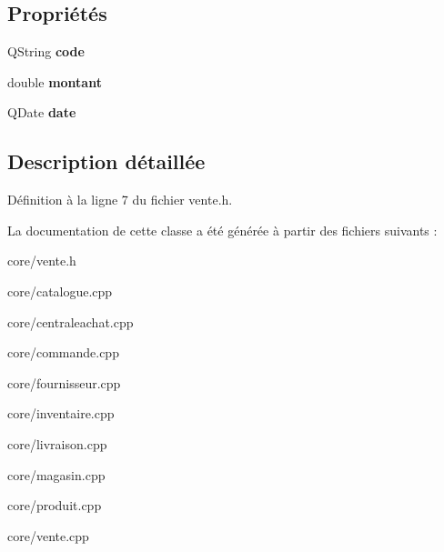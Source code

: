 \subsection*{Propriétés}
\begin{DoxyCompactItemize}
\item 
\hypertarget{class_vente_a6896578d31d7e92927ce3130b4433299}{
QString {\bfseries code}}
\label{d8/dd9/class_vente_a6896578d31d7e92927ce3130b4433299}

\item 
\hypertarget{class_vente_a734b3af9d073cc63e119ac3b34cc97f8}{
double {\bfseries montant}}
\label{d8/dd9/class_vente_a734b3af9d073cc63e119ac3b34cc97f8}

\item 
\hypertarget{class_vente_a6878cc347d579a77bcacec58d12cb73c}{
QDate {\bfseries date}}
\label{d8/dd9/class_vente_a6878cc347d579a77bcacec58d12cb73c}

\end{DoxyCompactItemize}


\subsection{Description détaillée}


Définition à la ligne 7 du fichier vente.h.



La documentation de cette classe a été générée à partir des fichiers suivants :\begin{DoxyCompactItemize}
\item 
core/vente.h\item 
core/catalogue.cpp\item 
core/centraleachat.cpp\item 
core/commande.cpp\item 
core/fournisseur.cpp\item 
core/inventaire.cpp\item 
core/livraison.cpp\item 
core/magasin.cpp\item 
core/produit.cpp\item 
core/vente.cpp\end{DoxyCompactItemize}
